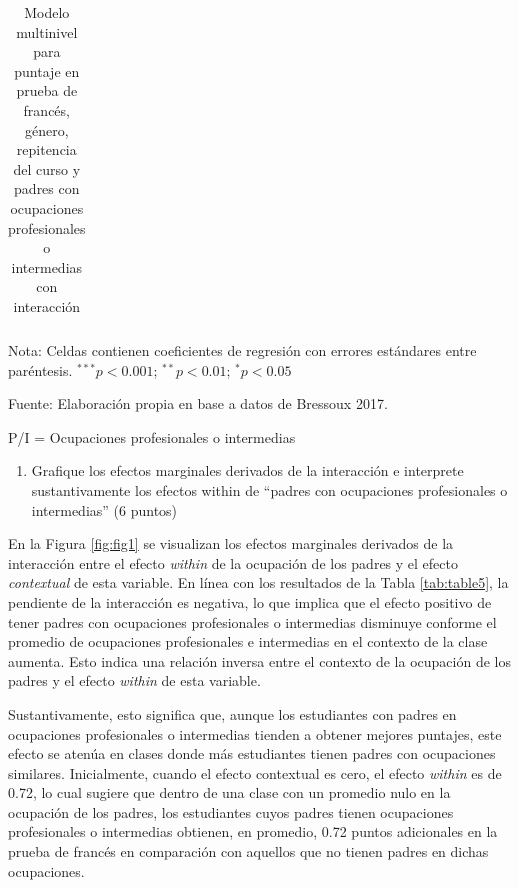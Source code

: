 \documentclass[
  12pt,
  a4paper,
]{article}
\providecommand{\tightlist}{%
  \setlength{\itemsep}{0pt}\setlength{\parskip}{0pt}}
\begin{document}
\begin{table}[H]
\begin{center}
{\begin{threeparttable}
\begin{tabular}{l c}
\bottomrule
\end{tabular}
\begin{tablenotes}[flushleft]
\scriptsize{\item Nota: Celdas contienen coeficientes de regresión con errores estándares entre paréntesis. $^{***}p<0.001$; $^{**}p<0.01$; $^{*}p<0.05$ \\ \item Fuente: Elaboración propia en base a datos de Bressoux 2017. \\ \item P/I = Ocupaciones profesionales o intermedias}
\end{tablenotes}
\end{threeparttable}
}
\caption{\label{tab:table5} Modelo multinivel para puntaje en prueba de francés, género, repitencia del curso y padres con ocupaciones profesionales o intermedias con interacción}
\label{table:coefficients}
\end{center}
\end{table}

\begin{enumerate}
\def\labelenumi{\alph{enumi})}
\setcounter{enumi}{1}
\tightlist
\item
  Grafique los efectos marginales derivados de la interacción e interprete sustantivamente los efectos within de ``padres con ocupaciones profesionales o intermedias'' (6 puntos)
\end{enumerate}

En la Figura \ref{fig:fig1} se visualizan los efectos marginales derivados de la interacción entre el efecto \emph{within} de la ocupación de los padres y el efecto \emph{contextual} de esta variable. En línea con los resultados de la Tabla \ref{tab:table5}, la pendiente de la interacción es negativa, lo que implica que el efecto positivo de tener padres con ocupaciones profesionales o intermedias disminuye conforme el promedio de ocupaciones profesionales e intermedias en el contexto de la clase aumenta. Esto indica una relación inversa entre el contexto de la ocupación de los padres y el efecto \emph{within} de esta variable.

Sustantivamente, esto significa que, aunque los estudiantes con padres en ocupaciones profesionales o intermedias tienden a obtener mejores puntajes, este efecto se atenúa en clases donde más estudiantes tienen padres con ocupaciones similares. Inicialmente, cuando el efecto contextual es cero, el efecto \emph{within} es de 0.72, lo cual sugiere que dentro de una clase con un promedio nulo en la ocupación de los padres, los estudiantes cuyos padres tienen ocupaciones profesionales o intermedias obtienen, en promedio, 0.72 puntos adicionales en la prueba de francés en comparación con aquellos que no tienen padres en dichas ocupaciones.
\end{document}
